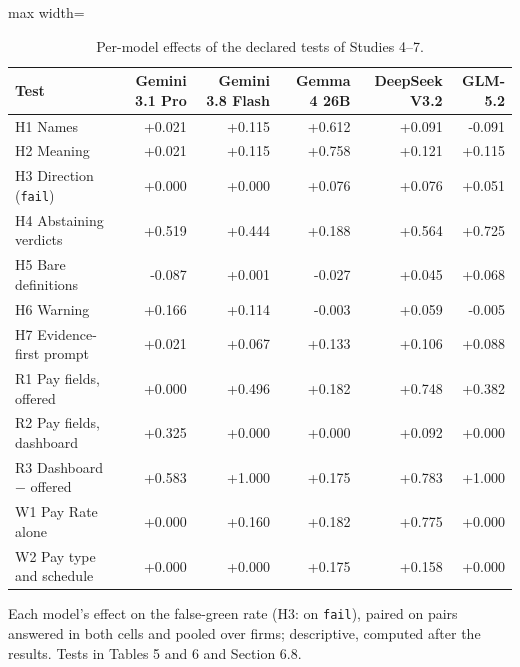 \documentclass[10pt,twocolumn]{article}
\begin{document}
\begin{table}[t]
\centering\footnotesize\setlength{\tabcolsep}{4pt}
\caption{Per-model effects of the declared tests of Studies 4–7.}
\label{tab:26}
\begin{adjustbox}{max width=\textwidth}
\begin{tabular}{lrrrrr}
\toprule
\textbf{Test} & \textbf{Gemini 3.1 Pro} & \textbf{Gemini 3.8 Flash} & \textbf{Gemma 4 26B} & \textbf{DeepSeek V3.2} & \textbf{GLM-5.2} \\
\midrule
H1 Names & +0.021 & +0.115 & +0.612 & +0.091 & -0.091 \\
H2 Meaning & +0.021 & +0.115 & +0.758 & +0.121 & +0.115 \\
H3 Direction (\texttt{fail}) & +0.000 & +0.000 & +0.076 & +0.076 & +0.051 \\
H4 Abstaining verdicts & +0.519 & +0.444 & +0.188 & +0.564 & +0.725 \\
H5 Bare definitions & -0.087 & +0.001 & -0.027 & +0.045 & +0.068 \\
H6 Warning & +0.166 & +0.114 & -0.003 & +0.059 & -0.005 \\
H7 Evidence-first prompt & +0.021 & +0.067 & +0.133 & +0.106 & +0.088 \\
R1 Pay fields, offered & +0.000 & +0.496 & +0.182 & +0.748 & +0.382 \\
R2 Pay fields, dashboard & +0.325 & +0.000 & +0.000 & +0.092 & +0.000 \\
R3 Dashboard − offered & +0.583 & +1.000 & +0.175 & +0.783 & +1.000 \\
W1 Pay Rate alone & +0.000 & +0.160 & +0.182 & +0.775 & +0.000 \\
W2 Pay type and schedule & +0.000 & +0.000 & +0.175 & +0.158 & +0.000 \\
\bottomrule
\end{tabular}
\end{adjustbox}
\par\vspace{3pt}\begin{minipage}{\textwidth}\scriptsize Each model's effect on the false-green rate (H3: on \texttt{fail}), paired on pairs answered in both cells and pooled over firms; descriptive, computed after the results. Tests in Tables 5 and 6 and Section 6.8.\end{minipage}
\end{table}
\end{document}
